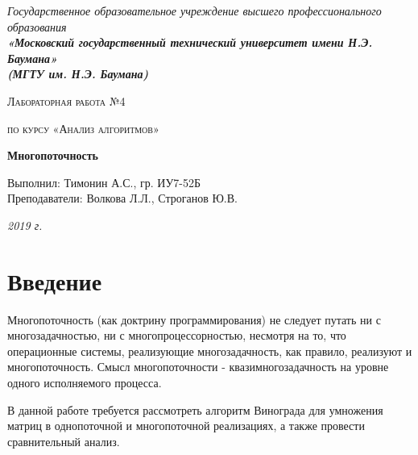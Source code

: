 \documentclass[12pt, a4paper]{report}
\begin{document}
    \begin{titlepage}

        \begin{center}
            \Large
            {\sl Государственное образовательное учреждение высшего профессионального образования\\
            {\bf«Московский государственный технический университет имени Н.Э. Баумана»\\
				(МГТУ им. Н.Э. Баумана)}}
            \vspace{3cm}

			{\scshape\LARGE Лабораторная работа №4 \par}
			\vspace{0.5cm}	
			{\scshape\LARGE по курсу «Анализ алгоритмов» \par}
			\vspace{1.5cm}
			{\huge\bfseries Многопоточность \par}
			\vspace{2cm}
			\Large Выполнил: Тимонин А.С., гр. ИУ7-52Б\\
			\vspace{0.5cm}
			{\Large Преподаватели: Волкова Л.Л., Строганов Ю.В.}
		
			\vfill
			\Large \textit {2019 г.}
            
        \end{center}

    \end{titlepage}
	
	\tableofcontents

	\chapter*{Введение}
	
	\vspace{-0.5cm}\hspace{0.6cm}Многопоточность (как доктрину программирования) не следует путать ни с многозадачностью, ни с многопроцессорностью, несмотря на то, что операционные системы, реализующие многозадачность, как правило, реализуют и многопоточность. Смысл многопоточности - квазимногозадачность на уровне одного исполняемого процесса\cite{Volkova}.
		
	\vspace{0.3cm}В данной работе требуется рассмотреть алгоритм Винограда для умножения матриц в однопоточной и многопоточной реализациях, а также провести сравнительный анализ.
	
\end{document}

